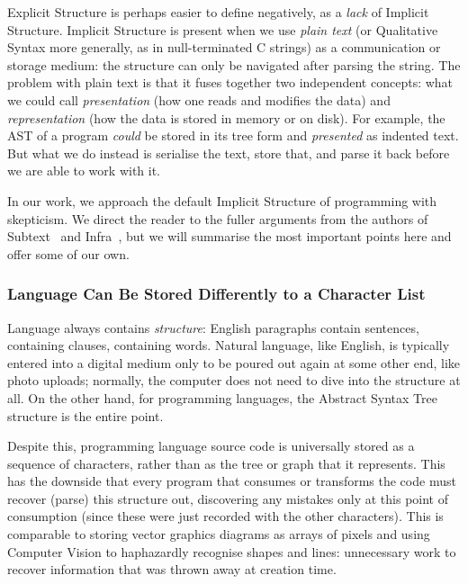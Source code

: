 \documentclass[ twoside,openright,titlepage,numbers=noenddot,headinclude,footinclude,cleardoublepage=empty,abstract=on,
                BCOR=5mm,paper=a4,fontsize=11pt
                ]{scrreprt}
\theoremstyle{definition}
\begin{document}
Explicit Structure is perhaps easier to define negatively, as a
\emph{lack} of Implicit Structure. Implicit Structure is present when we
use \emph{plain text} (or Qualitative Syntax more generally, as in
null-terminated C strings) as a communication or storage medium: the
structure can only be navigated after parsing the string. The problem
with plain text is that it fuses together two independent concepts: what
we could call \emph{presentation} (how one reads and modifies the data)
and \emph{representation} (how the data is stored in memory or on disk).
For example, the AST of a program \emph{could} be stored in its tree
form and \emph{presented} as indented text. But what we do instead is
serialise the text, store that, and parse it back before we are able to
work with it.

In our work, we approach the default Implicit Structure of programming
with skepticism. We direct the reader to the fuller arguments from the
authors of Subtext~\parencite{Subtext} and Infra~\parencite{Infra}, but
we will summarise the most important points here and offer some of our
own.

\hypertarget{language-can-be-stored-differently-to-a-character-list}{\subsubsection{Language Can Be Stored Differently to a Character
List}\label{language-can-be-stored-differently-to-a-character-list}}

Language always contains \emph{structure}: English paragraphs contain
sentences, containing clauses, containing words. Natural language, like
English, is typically entered into a digital medium only to be poured
out again at some other end, like photo uploads; normally, the computer
does not need to dive into the structure at all. On the other hand, for
programming languages, the Abstract Syntax Tree structure is the entire
point.

Despite this, programming language source code is universally stored as
a sequence of characters, rather than as the tree or graph that it
represents. This has the downside that every program that consumes or
transforms the code must recover (parse) this structure out, discovering
any mistakes only at this point of consumption (since these were just
recorded with the other characters). This is comparable to storing
vector graphics diagrams as arrays of pixels and using Computer Vision
to haphazardly recognise shapes and lines: unnecessary work to recover
information that was thrown away at creation time.
\end{document}
